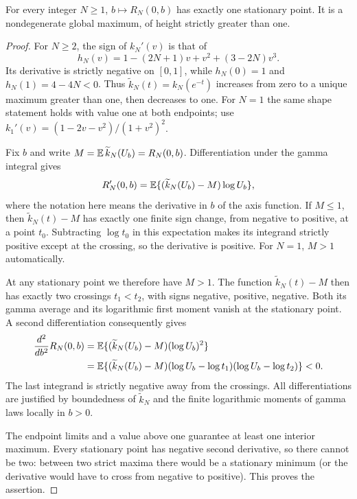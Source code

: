 \begin{proposition}
\label{eul:prop:axisunique}
For every integer $N\geq1$, $b\mapsto R_N(0,b)$ has exactly one
stationary point.  It is a nondegenerate global maximum, of height
strictly greater than one.
\end{proposition}
\begin{proof}
For $N\geq2$, the sign of $k_N'(v)$ is that of
\[
 h_N(v)=1-(2N+1)v+v^2+(3-2N)v^3.
\]
Its derivative is strictly negative on $[0,1]$, while
$h_N(0)=1$ and $h_N(1)=4-4N<0$.
Thus $\widetilde k_N(t)=k_N(e^{-t})$ increases from zero to a unique maximum
greater than one, then decreases to one.  For $N=1$ the same shape
statement holds with value one at both endpoints; use
$k_1'(v)=(1-2v-v^2)/(1+v^2)^2$.

Fix $b$ and write $M=\operatorname{\mathbb E} \widetilde k_N(U_b)=R_N(0,b)$.
Differentiation under the gamma integral gives
\[
 R_N'(0,b)=\operatorname{\mathbb E}\{(\widetilde k_N(U_b)-M)\log U_b\},
\]
where the notation here means the derivative in $b$ of the axis
function.  If $M\leq1$, then $\widetilde k_N(t)-M$ has exactly one finite sign
change, from negative to positive, at a point $t_0$.
Subtracting $\log t_0$ in this expectation makes its integrand
strictly positive except at the crossing, so the derivative is
positive.  For $N=1$, $M>1$ automatically.

At any stationary point we therefore have $M>1$.  The function
$\widetilde k_N(t)-M$ then has exactly two crossings $t_1<t_2$, with signs
negative, positive, negative.  Both its gamma average and its
logarithmic first moment vanish at the stationary point.  A second
differentiation consequently gives
\begin{align*}
 \frac{d^2}{db^2}R_N(0,b)
 &=\operatorname{\mathbb E}\{(\widetilde k_N(U_b)-M)(\log U_b)^2\}\\
 &=\operatorname{\mathbb E}\{(\widetilde k_N(U_b)-M)(\log U_b-\log t_1)
                          (\log U_b-\log t_2)\}<0.
\end{align*}
The last integrand is strictly negative away from the crossings.
All differentiations are justified by boundedness of $\widetilde k_N$ and the
finite logarithmic moments of gamma laws locally in $b>0$.

The endpoint limits and a value above one guarantee at least one
interior maximum.  Every stationary point has negative second
derivative, so there cannot be two: between two strict maxima there
would be a stationary minimum (or the derivative would have to
cross from negative to positive).  This proves the assertion.
\end{proof}

